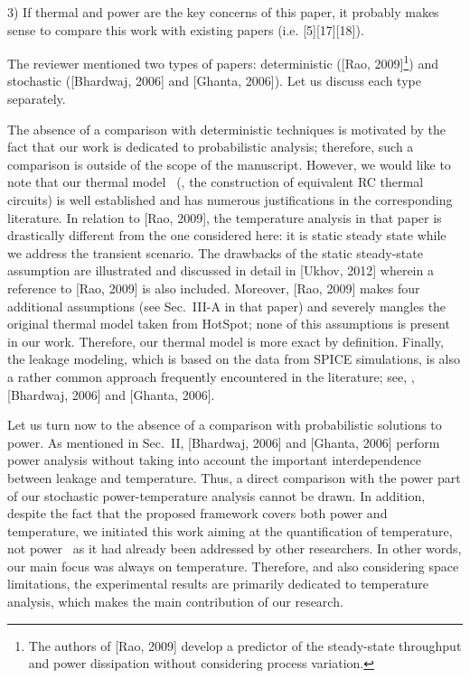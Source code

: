 \begin{reviewer}
3) If thermal and power are the key concerns of this paper, it probably makes sense to compare this work with existing papers (i.e. [5][17][18]).
\end{reviewer}
\begin{authors}
The reviewer mentioned two types of papers: deterministic ([Rao, 2009]\footnote{The authors of [Rao, 2009] develop a predictor of the steady-state throughput and power dissipation without considering process variation.}) and stochastic ([Bhardwaj, 2006] and [Ghanta, 2006]).
Let us discuss each type separately.

The absence of a comparison with deterministic techniques is motivated by the fact that our work is dedicated to probabilistic analysis; therefore, such a comparison is outside of the scope of the manuscript.
However, we would like to note that our thermal model \perse\ (\ie, the construction of equivalent RC thermal circuits) is well established and has numerous justifications in the corresponding literature.
In relation to [Rao, 2009], the temperature analysis in that paper is drastically different from the one considered here: it is static steady state while we address the transient scenario.
The drawbacks of the static steady-state assumption are illustrated and discussed in detail in [Ukhov, 2012] wherein a reference to [Rao, 2009] is also included.
Moreover, [Rao, 2009] makes four additional assumptions (see Sec.~III-A in that paper) and severely mangles the original thermal model taken from HotSpot; none of this assumptions is present in our work.
Therefore, our thermal model is more exact by definition.
Finally, the leakage modeling, which is based on the data from SPICE simulations, is also a rather common approach frequently encountered in the literature; see, \eg, [Bhardwaj, 2006] and [Ghanta, 2006].

Let us turn now to the absence of a comparison with probabilistic solutions to power.
As mentioned in Sec.~II, [Bhardwaj, 2006] and [Ghanta, 2006] perform power analysis without taking into account the important interdependence between leakage and temperature.
Thus, a direct comparison with the power part of our stochastic power-temperature analysis cannot be drawn.
In addition, despite the fact that the proposed framework covers both power and temperature, we initiated this work aiming at the quantification of temperature, not power \perse\ as it had already been addressed by other researchers.
In other words, our main focus was always on temperature.
Therefore, and also considering space limitations, the experimental results are primarily dedicated to temperature analysis, which makes the main contribution of our research.


\end{authors}
